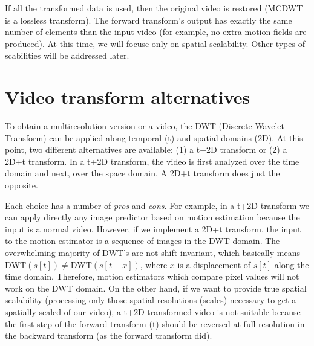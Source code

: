 If all the transformed data is used, then the original video is restored
(MCDWT is a lossless transform). The forward transform's output has
exactly the same number of elements than the input video (for example,
no extra motion fields are produced). At this time, we will focuse only
on spatial
\href{http://inst.eecs.berkeley.edu/~ee290t/sp04/lectures/videowavelet_UCB1-3.pdf}{scalability}.
Other types of scabilities will be addressed later.

\section{Video transform alternatives}
To obtain a multiresolution version or a video, the
\href{https://en.wikipedia.org/wiki/Discrete_wavelet_transform}{DWT}
(Discrete Wavelet Transform) can be applied along temporal (t) and
spatial domains (2D). At this point, two different alternatives are
available: (1) a t+2D transform or (2) a 2D+t transform. In a t+2D
transform, the video is first analyzed over the time domain and next,
over the space domain. A 2D+t transform does just the opposite.

Each choice has a number of \emph{pros} and \emph{cons}. For example, in
a t+2D transform we can apply directly any image predictor based on
motion estimation because the input is a normal video. However, if we
implement a 2D+t transform, the input to the motion estimator is a
sequence of images in the DWT domain.
\href{http://www.polyvalens.com/blog/wavelets/theory}{The overwhelming
majority of DWT's} are not
\href{http://www.polyvalens.com/blog/wavelets/theory}{shift invariant},
which basically means \(\text{DWT}(s[t]) \neq \text{DWT}(s[t+x])\),
where \(x\) is a displacement of \(s[t]\) along the time domain.
Therefore, motion estimators which compare pixel values will not work on
the DWT domain. On the other hand, if we want to provide true spatial
scalability (processing only those spatial resolutions (scales)
necessary to get a spatially scaled of our video), a t+2D transformed
video is not suitable because the first step of the forward transform
(t) should be reversed at full resolution in the backward transform (as
the forward transform did).

